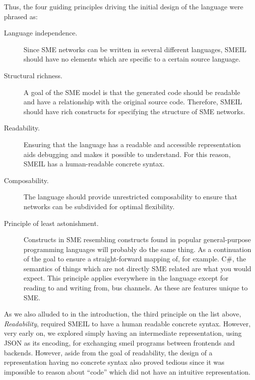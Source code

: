 

Thus, the four guiding principles driving the initial design of the language
were phrased as:
\begin{description}
\item[Language independence.] Since SME networks can be written in several
  different languages, SMEIL should have no elements which are specific to a
  certain source language.
\item[Structural richness.] A goal of the SME model is that the generated code
  should be readable and have a relationship with the original source
  code. Therefore, SMEIL should have rich constructs for specifying the
  structure of SME networks.
\item[Readability.] Ensuring that the language has a readable and accessible
  representation aids debugging and makes it possible to understand. For this
  reason, SMEIL has a human-readable concrete syntax.
\item[Composability.] The language should provide unrestricted composability to
  ensure that networks can be subdivided for optimal flexibility.
\item[Principle of least astonishment.] Constructs in SME resembling constructs
  found in popular general-purpose programming languages will probably do the
  same thing. As a continuation of the goal to ensure a straight-forward mapping
  of, for example. C\#, the semantics of things which are not directly SME
  related are what you would expect. This principle applies everywhere in the
  language except for reading to and writing from, bus channels. As these are
  features unique to SME.
\end{description}



 As we also alluded to in the introduction, the third principle on
the list above, {\itshape Readability}, required SMEIL to have a human readable
concrete syntax. However, very early on, we explored simply having an
intermediate representation, using JSON as its encoding, for exchanging
\gls{smeil} programs between frontends and backends. However, aside from the
goal of readability, the design of a representation having no concrete syntax
also proved tedious since it was impossible to reason about ``code'' which did
not have an intuitive representation.

